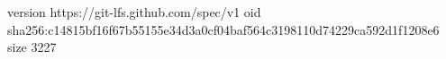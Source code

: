 version https://git-lfs.github.com/spec/v1
oid sha256:c14815bf16f67b55155e34d3a0cf04baf564c3198110d74229ca592d1f1208e6
size 3227
